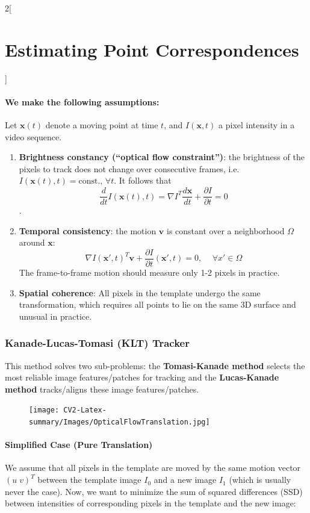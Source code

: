 \documentclass[oneside,fontsize=11pt,paper=a4]{scrartcl}
\begin{document}
\begin{multicols}{2}[\section{Estimating Point Correspondences}]
\paragraph{We make the following assumptions:} Let $\mathbf{x}(t)$ denote a moving point at time $t$, and $I(\mathbf{x},t)$ a pixel intensity in a video sequence.
\begin{enumerate}
	\item \textbf{Brightness constancy (``optical flow constraint'')}: the brightness of the pixels to track does not change over consecutive frames, i.e.\ $I(\mathbf{x}(t),t) = \text{const.}, \, \forall t $. It follows that
    $$\frac{d}{dt}I(\mathbf{x}(t),t) = \nabla I^T \frac{d\mathbf{x}}{dt} + \frac{\partial I}{\partial t} = 0$$.
	\item \textbf{Temporal consistency}: the motion $\mathbf{v}$ is constant over a neighborhood $\Omega$ around  $\mathbf{x}$:
    $$\nabla I(\mathbf{x}',t)^T \mathbf{v} + \frac{\partial I}{\partial t}(\mathbf{x}',t) = 0, \,\quad \forall x' \in \Omega$$
    The frame-to-frame motion should measure only 1-2 pixels in practice.
    \item \textbf{Spatial coherence}: All pixels in the template undergo the same transformation, which requires all points to lie on the same 3D surface and unusual in practice.
\end{enumerate}

\subsubsection{Kanade-Lucas-Tomasi (KLT) Tracker}

This method solves two sub-problems: the \textbf{Tomasi-Kanade method} selects the most reliable image features/patches for tracking and the \textbf{Lucas-Kanade method} tracks/aligns these image features/patches.

\begin{figure}
    \texttt{[image: CV2-Latex-summary/Images/OpticalFlowTranslation.jpg]}
\end{figure}
\paragraph{Simplified Case (Pure Translation)} We assume that all pixels in the template are moved by the same motion vector $(u\;v)^T$ between the template image $I_0$ and a new image $I_1$ (which is usually never the case). Now, we want to minimize the sum of squared differences (SSD) between intensities of corresponding pixels in the template and the new image:


\end{multicols}
\end{document}
